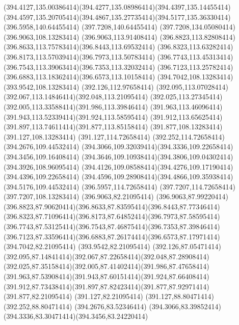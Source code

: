 {{	\curveto(394.4127,135.00386414)(394.4277,135.08986414)(394.4397,135.14455414)
	\curveto(394.4597,135.20705414)(394.4867,135.27735414)(394.5177,135.36330414)
	\lineto(396.5958,140.64455414)
	\lineto(397.7208,140.64455414)
	\lineto(397.7208,134.05080414)
	\closepath
	\moveto(396.9063,108.13283414)
	\lineto(396.9063,113.91408414)
	\curveto(396.8823,113.82808414)(396.8633,113.75783414)(396.8443,113.69532414)
	\curveto(396.8323,113.63282414)(396.8173,113.57039414)(396.7973,113.50783414)
	\curveto(396.7743,113.45313414)(396.7543,113.39063414)(396.7353,113.32032414)
	\curveto(396.7123,113.25782414)(396.6883,113.18362414)(396.6573,113.10158414)
	\lineto(394.7042,108.13283414)
	\lineto(393.9542,108.13283414)
	\lineto(392.126,112.97658414)
	\curveto(392.095,113.07028414)(392.067,113.14846414)(392.048,113.21095414)
	\curveto(392.025,113.27345414)(392.005,113.33588414)(391.986,113.39846414)
	\curveto(391.963,113.46096414)(391.943,113.52339414)(391.924,113.58595414)
	\curveto(391.912,113.65625414)(391.897,113.74611414)(391.877,113.85158414)
	\lineto(391.877,108.13283414)
	\lineto(391.127,108.13283414)
	\lineto(391.127,114.72658414)
	\lineto(392.252,114.72658414)
	\lineto(394.2676,109.44532414)
	\curveto(394.3066,109.32039414)(394.3336,109.22658414)(394.3456,109.16408414)
	\curveto(394.3646,109.10938414)(394.3806,109.04302414)(394.3926,108.96095414)
	\curveto(394.4126,109.08588414)(394.4276,109.17190414)(394.4396,109.22658414)
	\curveto(394.4596,109.28908414)(394.4866,109.35938414)(394.5176,109.44532414)
	\lineto(396.5957,114.72658414)
	\lineto(397.7207,114.72658414)
	\lineto(397.7207,108.13283414)
	\closepath
	\moveto(396.9063,82.21095414)
	\lineto(396.9063,87.99220414)
	\curveto(396.8823,87.90620414)(396.8633,87.83595414)(396.8443,87.77346414)
	\curveto(396.8323,87.71096414)(396.8173,87.64852414)(396.7973,87.58595414)
	\curveto(396.7743,87.53125414)(396.7543,87.46875414)(396.7353,87.39846414)
	\curveto(396.7123,87.33596414)(396.6883,87.26174414)(396.6573,87.17971414)
	\lineto(394.7042,82.21095414)
	\lineto(393.9542,82.21095414)
	\lineto(392.126,87.05471414)
	\curveto(392.095,87.14841414)(392.067,87.22658414)(392.048,87.28908414)
	\curveto(392.025,87.35158414)(392.005,87.41402414)(391.986,87.47658414)
	\curveto(391.963,87.53908414)(391.943,87.60151414)(391.924,87.66408414)
	\curveto(391.912,87.73438414)(391.897,87.82423414)(391.877,87.92971414)
	\lineto(391.877,82.21095414)
	\lineto(391.127,82.21095414)
	\lineto(391.127,88.80471414)
	\lineto(392.252,88.80471414)
	\lineto(394.2676,83.52346414)
	\curveto(394.3066,83.39852414)(394.3336,83.30471414)(394.3456,83.24220414)
}}
